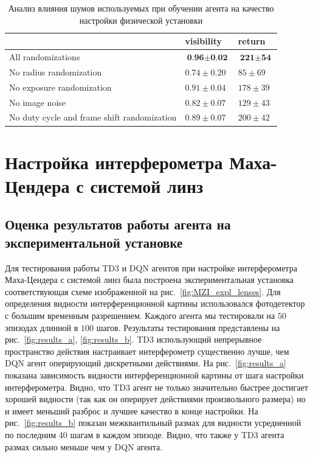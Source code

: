 \begin{table} [htbp]
    \centering
    \begin{threeparttable}
        \caption{Анализ влияния шумов используемых при обучении агента на качество настройки физической установки}\label{tab:abl}
        \begin{tabular}{| p{10cm} || p{3cm} || p{3cm} |}
            \hline
            \hline
             & visibility & return \\
            \hline
            All randomizations  & $\textbf{0.96} \pm \textbf{0.02}$ & $\textbf{221} \pm \textbf{54}$ \\
            No radius randomization & $0.74 \pm 0.20$ & $85 \pm 69$ \\
            No exposure randomization& $0.91 \pm 0.04$ & $178 \pm 39$ \\
            No image noise & $0.82 \pm 0.07$ & $129 \pm 43$ \\
            No duty cycle and frame shift randomization  &  $0.89 \pm 0.07$ & $200 \pm 42$ \\
            \hline
            \hline
        \end{tabular}
    \end{threeparttable}
\end{table}


\section{Настройка интерферометра Маха-Цендера с системой линз}

\subsection{Оценка результатов работы агента на экспериментальной установке}

Для тестирования работы TD3 и DQN агентов при настройке интерферометра Маха-Цендера с системой линз была построена экспериментальная установка соответствующая схеме изображенной на рис.~\ref{fig:MZI_expl_lenses}. Для определения видности интерференционной картины использовался фотодетектор с большим временным разрешением. Каждого агента мы тестировали на $50$ эпизодах длинной в $100$ шагов. Результаты тестирования представлены на рис.~\ref{fig:results_a}, \ref{fig:results_b}. TD3 использующий непрерывное пространство действия настраивает интерферометр существенно лучше, чем DQN агент оперирующий дискретными действиями. На рис.~\ref{fig:results_a} показана зависимость видности интерференционной картины от шага настройки интерферометра. Видно, что TD3 агент не только значительно быстрее достигает хорошей видности (так как он оперирует действиями произвольного размера) но и имеет меньший разброс и лучшее качество в конце настройки. На рис.~\ref{fig:results_b} показан межквантильный размах для видности усредненной по последним 40 шагам в каждом эпизоде. Видно, что также у TD3 агента размах сильно меньше чем у DQN агента.

